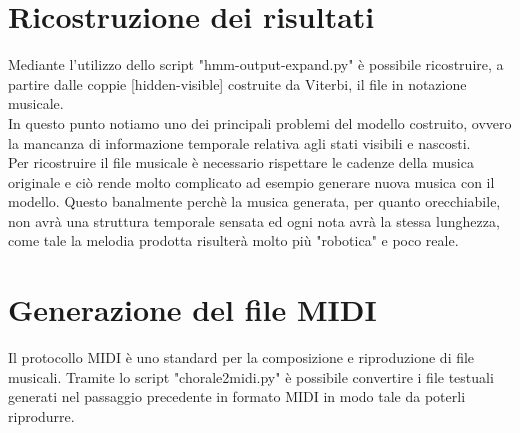 \section{Ricostruzione dei risultati}
Mediante l'utilizzo dello script "hmm-output-expand.py" è possibile ricostruire, a partire dalle coppie [hidden-visible] costruite da Viterbi, il file in notazione musicale.\\
In questo punto notiamo uno dei principali problemi del modello costruito, ovvero la mancanza di informazione temporale relativa agli stati visibili e nascosti. \\
Per ricostruire il file musicale è necessario rispettare le cadenze della musica originale e ciò rende molto complicato ad esempio generare nuova musica con il modello. Questo banalmente perchè la musica generata, per quanto orecchiabile, non avrà una struttura temporale sensata ed ogni nota avrà la stessa lunghezza, come tale la melodia prodotta risulterà molto più "robotica" e poco reale.
\section{Generazione del file MIDI}
Il protocollo MIDI è uno standard per la composizione e riproduzione di file musicali. Tramite lo script "chorale2midi.py" è possibile convertire i file testuali generati nel passaggio precedente in formato MIDI in modo tale da poterli riprodurre. \\
